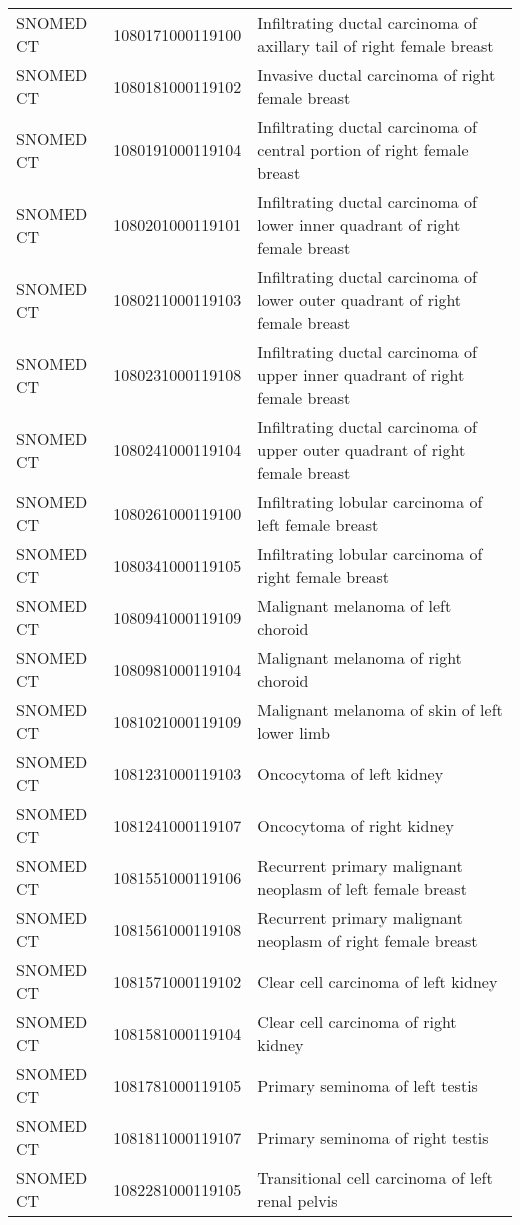 \begin{longtable}{p{}p{}p{}}
  SNOMED CT & 1080171000119100 & Infiltrating ductal carcinoma of axillary tail of right female breast \\ 
  SNOMED CT & 1080181000119102 & Invasive ductal carcinoma of right female breast \\ 
  SNOMED CT & 1080191000119104 & Infiltrating ductal carcinoma of central portion of right female breast \\ 
  SNOMED CT & 1080201000119101 & Infiltrating ductal carcinoma of lower inner quadrant of right female breast \\ 
  SNOMED CT & 1080211000119103 & Infiltrating ductal carcinoma of lower outer quadrant of right female breast \\ 
  SNOMED CT & 1080231000119108 & Infiltrating ductal carcinoma of upper inner quadrant of right female breast \\ 
  SNOMED CT & 1080241000119104 & Infiltrating ductal carcinoma of upper outer quadrant of right female breast \\ 
  SNOMED CT & 1080261000119100 & Infiltrating lobular carcinoma of left female breast \\ 
  SNOMED CT & 1080341000119105 & Infiltrating lobular carcinoma of right female breast \\ 
  SNOMED CT & 1080941000119109 & Malignant melanoma of left choroid \\ 
  SNOMED CT & 1080981000119104 & Malignant melanoma of right choroid \\ 
  SNOMED CT & 1081021000119109 & Malignant melanoma of skin of left lower limb \\ 
  SNOMED CT & 1081231000119103 & Oncocytoma of left kidney \\ 
  SNOMED CT & 1081241000119107 & Oncocytoma of right kidney \\ 
  SNOMED CT & 1081551000119106 & Recurrent primary malignant neoplasm of left female breast \\ 
  SNOMED CT & 1081561000119108 & Recurrent primary malignant neoplasm of right female breast \\ 
  SNOMED CT & 1081571000119102 & Clear cell carcinoma of left kidney \\ 
  SNOMED CT & 1081581000119104 & Clear cell carcinoma of right kidney \\ 
  SNOMED CT & 1081781000119105 & Primary seminoma of left testis \\ 
  SNOMED CT & 1081811000119107 & Primary seminoma of right testis \\ 
  SNOMED CT & 1082281000119105 & Transitional cell carcinoma of left renal pelvis \\ 

\end{longtable}
